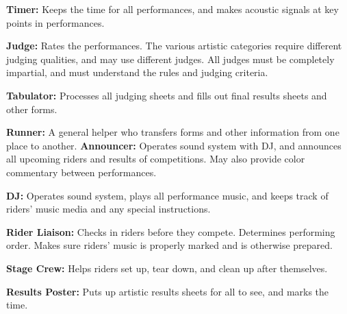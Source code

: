 \textbf{Timer:} Keeps the time for all performances, and makes acoustic signals at key points in performances.

\textbf{Judge:} Rates the performances.
The various artistic categories require different judging qualities, and may use different judges.
All judges must be completely impartial, and must understand the rules and judging criteria.

\textbf{Tabulator:} Processes all judging sheets and fills out final results sheets and other forms.

\textbf{Runner:} A general helper who transfers forms and other information from one place to another.
\textbf{Announcer:} Operates sound system with DJ, and announces all upcoming riders and results of competitions.
May also provide color commentary between performances.

\textbf{DJ:} Operates sound system, plays all performance music, and keeps track of riders' music media and any special instructions.

\textbf{Rider Liaison:} Checks in riders before they compete.
Determines performing order.
Makes sure riders' music is properly marked and is otherwise prepared.

\textbf{Stage Crew:} Helps riders set up, tear down, and clean up after themselves.

\textbf{Results Poster:} Puts up artistic results sheets for all to see, and marks the time.
